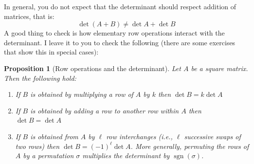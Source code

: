 \documentclass[12pt]{article}
\numberwithin{equation}{subsection}
\numberwithin{figure}{subsection}
\newtheorem{prop}[subsection]{Proposition}
\theoremstyle{note}
\begin{document}
In general, you do not expect that the determinant should respect addition of matrices, that is: \[ \det (A+B)\neq \det A+\det B\]
A good thing to check is how elementary row operations interact with the determinant. I leave it to you to check the following (there are some exercises that show this in special cases):

\begin{prop}[Row operations and the determinant] \label{prop-elm-mat} Let $A$ be a square matrix. Then the following hold:
\begin{enumerate}
	\item If $B$ is obtained by multiplying a row of $A$ by $k$ then $\det B=k\det A$
	\item If $B$ is obtained by adding a row to another row within $A$ then $\det B=\det A$
	\item If $B$ is obtained from $A$ by $\ell$ row \textit{interchanges} (i.e., $\ell$ successive swaps of two rows) then $\det B=(-1)^{\ell}\det A$. More generally, permuting the rows of $A$ by a permutation $\sigma$ multiplies the determinant by $\operatorname{sgn}(\sigma)$. 
\end{enumerate}
\end{prop}
\end{document}
